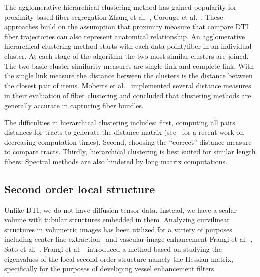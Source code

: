 
 
 The agglomerative hierarchical clustering method \cite{DudaHartStork01} has gained popularity for proximity based fiber segregation Zhang et al.~\cite{Zhang2008}, Corouge et al.~\cite{Corouge2004}. 
 These approaches build on the assumption that proximity measure that compare DTI fiber trajectories can also represent anatomical relationship. An agglomerative hierarchical clustering method starts with each data point/fiber in an individual cluster. At each stage of the algorithm the two most similar clusters are joined. The two basic cluster similarity measures are single-link and complete-link. With the single link measure the distance between the clusters is the distance between the closest pair of items. 
Moberts et al.~\cite{Moberts2005} implemented several distance measures in their evaluation of fiber clustering and concluded that clustering methods are generally accurate in capturing fiber bundles. 

The difficulties in hierarchical clustering includes; first, computing all pairs distances for tracts to generate the distance matrix (see~\cite{Garyfallidis2012} for a recent work on decreasing computation times). Second, choosing the ``correct'' distance measure to compare tracts. Thirdly, hierarchical clustering is best suited for similar length fibers.
Spectral methods are also hindered by long matrix computations.



\subsection{Second order local structure}

Unlike DTI, we do not have diffusion tensor data. Instead, we have a scalar volume with tubular structures embedded in them. Analyzing curvilinear structures in volumetric images has been utilized for a variety of purposes including center line extraction~\cite{Bouix2005} and vascular image enhancement Frangi et al.~\cite{Frangi1998}, Sato et al.~\cite{Sato1997}. Frangi et al.~\cite{Frangi1998} introduced a method based on studying the eigenvalues of the local second order structure namely the Hessian matrix, specifically for the purposes of developing vessel enhancement filters.


